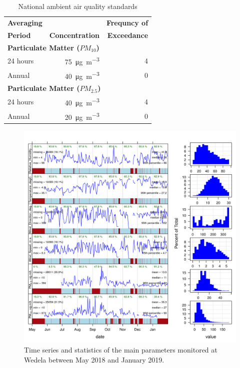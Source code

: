 \documentclass{nwureport}
\begin{document}
\begin{table}[!htbp]
\caption[National ambient air quality standards]{National ambient air quality standards \citep{RSA2009a}}
\label{table:naaqs}
\begin{center}
\begin{tabular}{l r r} 
\toprule 
\bfseries Averaging &                          & \bfseries Frequncy of \\
\bfseries Period    &  \bfseries Concentration & \bfseries Exceedance  \\
\midrule 
\multicolumn{3}{l}{\bfseries Particulate Matter ($PM_{10}$)} \\
24 hours &  \SI{75}{\micro\gram\per\cubic\meter} & 4 \\
Annual   &  \SI{40}{\micro\gram\per\cubic\meter} & 0 \\
\multicolumn{3}{l}{\bfseries Particulate Matter ($PM_{2.5}$)} \\
24 hours & \SI{40}{\micro\gram\per\cubic\meter} & 4 \\
Annual   & \SI{20}{\micro\gram\per\cubic\meter} & 0 \\
\bottomrule 
\end{tabular}
\end{center}
\end{table}

\begin{figure}[!htb]
    \centering
    \includegraphics[width=\textwidth]{images/Wedela-ams.png}
    \caption[Time series of main parameters measured at Wedela.]{Time series and statistics of the main parameters monitored at Wedela between May 2018 and January 2019.}
    \label{fig:summary}
\end{figure}
\end{document}
